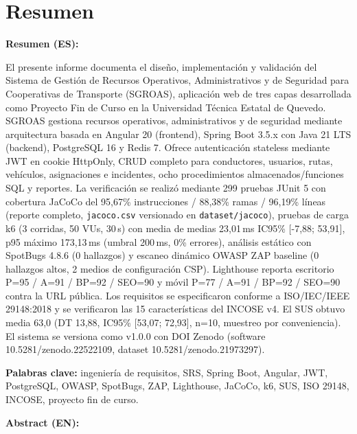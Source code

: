 \chapter*{Resumen}

\textbf{Resumen (ES):}

El presente informe documenta el diseño, implementación y validación del Sistema de Gestión de Recursos Operativos, Administrativos y de Seguridad para Cooperativas de Transporte (SGROAS), aplicación web de tres capas desarrollada como Proyecto Fin de Curso en la Universidad Técnica Estatal de Quevedo. SGROAS gestiona recursos operativos, administrativos y de seguridad mediante arquitectura basada en Angular 20 (frontend), Spring Boot 3.5.x con Java 21 LTS (backend), PostgreSQL 16 y Redis 7. Ofrece autenticación stateless mediante JWT en cookie HttpOnly, CRUD completo para conductores, usuarios, rutas, vehículos, asignaciones e incidentes, ocho procedimientos almacenados/funciones SQL y reportes. La verificación se realizó mediante 299 pruebas JUnit 5 con cobertura JaCoCo del 95,67\% instrucciones / 88,38\% ramas / 96,19\% líneas (reporte completo, \texttt{jacoco.csv} versionado en \texttt{dataset/jacoco}), pruebas de carga k6 (3 corridas, 50 VUs, 30\,s) con media de medias 23,01\,ms IC95\% [-7,88; 53,91], p95 máximo 173,13\,ms (umbral 200\,ms, 0\% errores), análisis estático con SpotBugs 4.8.6 (0 hallazgos) y escaneo dinámico OWASP ZAP baseline (0 hallazgos altos, 2 medios de configuración CSP). Lighthouse reporta escritorio P=95 / A=91 / BP=92 / SEO=90 y móvil P=77 / A=91 / BP=92 / SEO=90 contra la URL pública. Los requisitos se especificaron conforme a ISO/IEC/IEEE 29148:2018 y se verificaron las 15 características del INCOSE v4. El SUS obtuvo media 63,0 (DT 13,88, IC95\% [53,07; 72,93], n=10, muestreo por conveniencia). El sistema se versiona como v1.0.0 con DOI Zenodo (software 10.5281/zenodo.22522109, dataset 10.5281/zenodo.21973297).

\textbf{Palabras clave:} ingeniería de requisitos, SRS, Spring Boot, Angular, JWT, PostgreSQL, OWASP, SpotBugs, ZAP, Lighthouse, JaCoCo, k6, SUS, ISO 29148, INCOSE, proyecto fin de curso.

\medskip

\textbf{Abstract (EN):}

